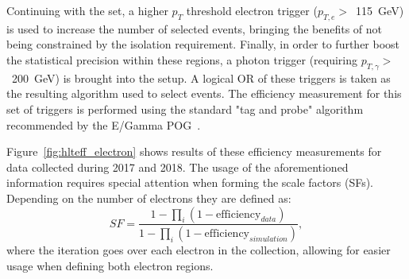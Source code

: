 \hspace{10pt} Continuing with the set, a higher $p_T$ threshold electron trigger ($p_{T,e}>$~115~GeV) is used to increase the number of selected events, bringing the benefits of not being constrained by the isolation requirement. Finally, in order to further boost the statistical precision within these regions, a photon trigger (requiring $p_{T,\gamma}>$~200~GeV) is brought into the setup. A logical OR of these triggers is taken as the resulting algorithm used to select events. The efficiency measurement for this set of triggers is performed using the standard "tag and probe" algorithm recommended by the E/Gamma POG~\cite{twiki:EGamma_tag_and_probe}.

\hspace{10pt} Figure~\ref{fig:hlteff_electron} shows results of these efficiency measurements for data collected during 2017 and 2018. The usage of the aforementioned information requires special attention when forming the scale factors (SFs). Depending on the number of electrons they are defined as:
\begin{equation}
    SF = \frac{1-\prod\limits_{i}(1-\text{efficiency}_{data})}{1-\prod\limits_{i}(1-\text{efficiency}_{simulation})},
\end{equation}
where the iteration goes over each electron in the collection, allowing for easier usage when defining both electron regions.

